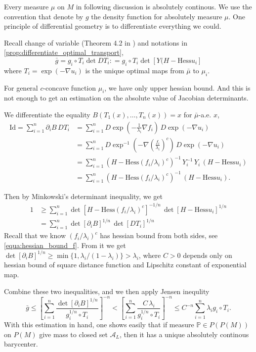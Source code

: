 Every measure $\mu$ on $M$ in following discussion is absolutely continous.
We use the convention that denote by $g$ the density function for absolutely measure $\mu$.
One principle of differential geometry is to differentiate everything we could.

Recall change of variable (Theorem 4.2 in \cite{cordero2001riemannian}) and notations in \cref{prop:differentiate_optimal_transport},
\[
	\bar{g} = g_i \circ T_i \det D T_i :
	= g_i \circ T_i \det[Y(H-\text{Hess} u_i]
\]
where $T_i = \exp(-\nabla u_i)$ is the unique optimal maps from $\bar{\mu}$ to $\mu_i$.

For general $c$-concave function $\mu_i$, we have only upper hessian bound.
And this is not enough to get an estimation on the absolute value of Jacobian determinants.

We differentiate the equality $B(T_1(x), \ldots, T_n(x))=x$ for $\bar{\mu}$-a.e. $x$,
\begin{align*}
	\text{Id} =\sum_{i=1}^n \partial_i B\, DT_i
&=\sum_{i=1}^n D \exp(-\frac{1}{\lambda_i}\nabla f_i) \, D \exp(-\nabla u_i)\\
&=\sum_{i=1}^n D \exp^{-1}(-\nabla \left( \frac{f_i}{\lambda_i}\right)^c) \, D \exp(-\nabla u_i)\\
&=\sum_{i=1}^n(H-\text{Hess}(f_i / \lambda_i)^c)^{-1}\,Y_i^{-1}\,
Y_i\,(H-\text{Hess} u_i)\\
&=\sum_{i=1}^n(H-\text{Hess}(f_i / \lambda_i)^c)^{-1}\,
(H-\text{Hess}u_i) .
\end{align*}

Then by Minkowski's determinant inequality, we get
\begin{align*}
	1 &\geq \sum_{i=1}^{n} \det [H-\text{Hess}(f_i/\lambda_i)^c]^{-1/n}\,\det[H-\text{Hess}u_i]^{1/n}\\
		&=\sum_{i=1}^n \det[\partial_i B]^{1/n}\,\det[DT_i]^{1/n}
\end{align*}
Recall that we know $(f_i / \lambda_i)^c$ has hessian bound from both sides, see \cref{equa:hessian_bound_f}.
From it we get $\det[\partial_i B]^{1/n} \geq \min \{1, \lambda_i / (1 - \lambda_i)\} > \lambda_i$,
where $C > 0$ depends only on hessian bound of square distance function and Lipschitz constant of exponential map.

Combine these two inequalities, and we then apply Jensen inequlity
\[
	\bar{g} \leq 
	\left[ \sum_{i=1}^n \frac{\det[\partial_i B]^{1/n}}
	{g_i^{1/n} \circ T_i}\right]^{-n}
	< \left[ \sum_{i=1}^n \frac{C \, \lambda_i}
	{g_i^{1/n} \circ T_i}\right]^{-n}
	\leq C^{-n} \sum_{i=1}^n \lambda_i g_i \circ T_i.
\]
With this estimation in hand,
one shows easily that if measure $\mathbb{P} \in P(P(M))$ on $P(M)$ give mass to closed set $\mathcal{A}_L$,
then it has a unique absolutely continous barycenter.

